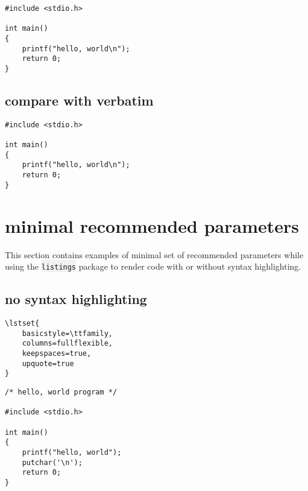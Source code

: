 \documentclass{article}
\newcommand{\ttt}[1]{\colorbox[HTML]{f0f0f0}{\texttt{#1}}}
\begin{document}
{
\lstset{
    basicstyle=\ttfamily,
    columns=fullflexible,
    keepspaces=true,
    language=c,
    showstringspaces=false,
}
\begin{lstlisting}
#include <stdio.h>

int main()
{
    printf("hello, world\n");
    return 0;
}
\end{lstlisting}
}

\subsection{compare with verbatim}
\begin{verbatim}
#include <stdio.h>

int main()
{
    printf("hello, world\n");
    return 0;
}
\end{verbatim}


\section{minimal recommended parameters}
This section contains examples of minimal set of recommended parameters
while using the \ttt{listings} package to render code with or without
syntax highlighting.

\subsection{no syntax highlighting}
{
\begin{lstlisting}
\lstset{
    basicstyle=\ttfamily,
    columns=fullflexible,
    keepspaces=true,
    upquote=true
}
\end{lstlisting}
}
{
\lstset{
    basicstyle=\ttfamily,
    columns=fullflexible,
    keepspaces=true,
    upquote=true
}
\begin{lstlisting}
/* hello, world program */

#include <stdio.h>

int main()
{
    printf("hello, world");
    putchar('\n');
    return 0;
}
\end{lstlisting}
}
\end{document}
